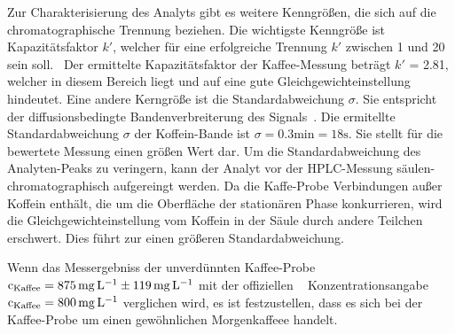 \documentclass{article}
\begin{document}
Zur Charakterisierung des Analyts gibt es weitere Kenngrößen, die sich auf die chromatographische Trennung beziehen.
Die wichtigste Kenngröße ist Kapazitätsfaktor $k'$, welcher für eine erfolgreiche Trennung $k'$ zwischen 1 und 20 sein soll.~\supercite{harris}
Der ermittelte Kapazitätsfaktor der Kaffee-Messung beträgt $k'$ = 2.81, welcher in diesem Bereich liegt
und auf eine gute Gleichgewichteinstellung hindeutet.
Eine andere Kerngröße ist die Standardabweichung $\sigma$. Sie entspricht der diffusionsbedingte Bandenverbreiterung des Signals~\supercite{harris}.
Die ermitellte Standardabweichung $\sigma$ der Koffein-Bande ist $\sigma = 0.3 \si{\minute} = 18 \si{\second}$.
Sie stellt für die bewertete Messung einen größen Wert dar. Um die Standardabweichung des Analyten-Peaks zu veringern, kann der Analyt
vor der HPLC-Messung säulen-chromatographisch aufgereingt werden. Da die Kaffe-Probe Verbindungen außer Koffein enthält,
die um die Oberfläche der stationären Phase konkurrieren, wird die Gleichgewichteinstellung vom Koffein in der
Säule durch andere Teilchen erschwert. Dies führt zur einen größeren Standardabweichung.


Wenn das Messergebniss der unverdünnten Kaffee-Probe
$\ce{c_{Kaffee}} = 875 \, \si{\milli\gram\per\liter} \pm 119  \, \si{\milli\gram\per\liter}$
 mit der \glqq offiziellen \grqq ~\supercite{koffeincom} Konzentrationsangabe $\ce{c_{Kaffee}} = 800 \, \si{\milli\gram\per\liter}$ verglichen wird,
 es ist festzustellen, dass es sich bei der Kaffee-Probe um einen gewöhnlichen Morgenkaffeee handelt.


\printbibliography
\end{document}
